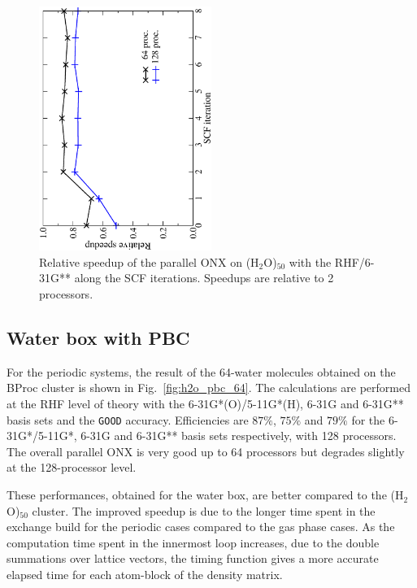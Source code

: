 \documentclass[prl,twocolumn,twocolumngrid,superbib]{revtex4} %
\begin{document}
\begin{figure}[h]
  \caption{\protect
    Relative speedup of the parallel ONX on (H$_2$O)$_{50}$ with the RHF/6-31G**
    along the SCF iterations.
    Speedups are relative to 2 processors.
  }\label{fig:h2o_50_prop}
  \includegraphics[angle=-90,width=0.5\textwidth]{h2o_50_prop}
\end{figure}

\subsection{Water box with PBC}
 For the periodic systems, the result of the 64-water molecules obtained on the BProc cluster is shown
 in Fig.~\ref{fig:h2o_pbc_64}. The calculations are performed at the
 RHF level of theory with the 6-31G*(O)/5-11G*(H), 6-31G and 6-31G** basis sets and the {\tt GOOD} accuracy. 
 Efficiencies are $87\%$, $75\%$ and $79\%$ for the 6-31G*/5-11G*, 6-31G and 6-31G** 
 basis sets respectively, with 128 processors. The overall parallel ONX is very
 good up to 64 processors but degrades slightly at the 128-processor level.

 These performances, obtained for the water box, are better compared to the (H$_2$O)$_{50}$ cluster. The 
 improved speedup is due to the longer time spent in the
 exchange build for the periodic cases compared 
 to the gas phase cases. As the computation time spent in the innermost loop 
 increases, due to the double summations over lattice vectors,
 the timing function gives a more accurate elapsed time for each 
 atom-block of the density matrix.\\
\end{document}
